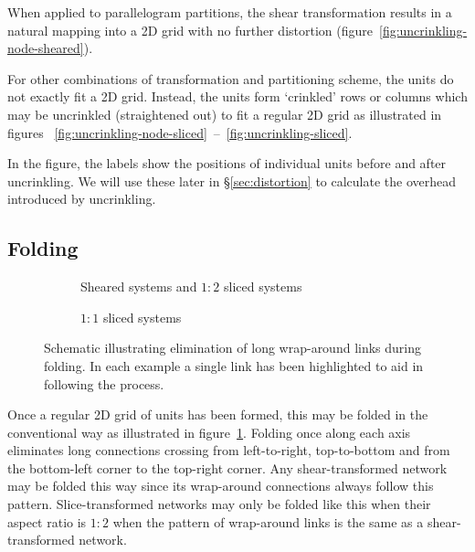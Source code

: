 			When applied to parallelogram partitions, the shear transformation
			results in a natural mapping into a 2D grid with no further distortion
			(figure~\ref{fig:uncrinkling-node-sheared}).
			
			For other combinations of transformation and partitioning scheme, the
			units do not exactly fit a 2D grid. Instead, the units form `crinkled'
			rows or columns which may be uncrinkled (straightened out) to fit a
			regular 2D grid as illustrated in figures~
			\ref{fig:uncrinkling-node-sliced}~--~\ref{fig:uncrinkling-sliced}.
			
			In the figure, the labels show the positions of individual units before
			and after uncrinkling. We will use these later in \S\ref{sec:distortion}
			to calculate the overhead introduced by uncrinkling.
		
		\subsection{Folding}
			
			\begin{figure}
				\begin{subfigure}{\linewidth}
					\center
					\caption{Sheared systems and $1:2$ sliced systems}
					\label{fig:folding-sheared}
				\end{subfigure}
				
				\vspace{1em}
				
				\begin{subfigure}{\linewidth}
					\center
					\caption{$1:1$ sliced systems}
					\label{fig:folding-sliced}
				\end{subfigure}
				
				\caption{Schematic illustrating elimination of long wrap-around links
				during folding. In each example a single link has been highlighted to
				aid in following the process.}
				\label{fig:folding}
			\end{figure}
			
			Once a regular 2D grid of units has been formed, this may be folded in
			the conventional way as illustrated in figure~\ref{fig:folding-sheared}.
			Folding once along each axis eliminates long connections crossing from
			left-to-right, top-to-bottom and from the bottom-left corner to the
			top-right corner. Any shear-transformed network may be folded this way
			since its wrap-around connections always follow this pattern.
			Slice-transformed networks may only be folded like this when their aspect
			ratio is $1:2$ when the pattern of wrap-around links is the same as a
			shear-transformed network.
			
